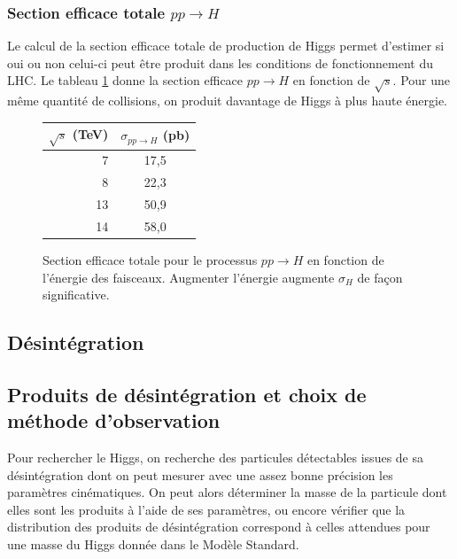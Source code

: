 \documentclass[11pt]{article} %
\begin{document}
\subsubsection{Section efficace totale $pp \to H$}

Le calcul de la section efficace totale de production de Higgs permet d'estimer si oui ou non celui-ci peut être produit dans les conditions de fonctionnement du LHC. Le tableau \ref{fig:xs_h} donne la  section efficace $pp\to H$ en fonction de $\sqrt{s}$. Pour une même quantité de collisions, on produit davantage de Higgs à plus haute énergie.

\begin{figure}[H]
      \centering
\begin{tabular}{|r|c|} 
   \hline
   $\sqrt{s}$ (TeV) & $\sigma_{pp \to H}$ (pb) \\
    \hline
   7 &  17,5\\
\hline
   8 & 22,3 \\
\hline
   13 & 50,9  \\
\hline
   14 & 58,0 \\
  \hline
\end{tabular}
\label{fig:xs_h}
\caption{Section efficace totale pour le processus $pp \to H$ en fonction de l'énergie des faisceaux. Augmenter l'énergie augmente $\sigma_H$ de façon significative.}
\end{figure}

\subsection{Désintégration}


\subsection{Produits de désintégration et choix de méthode d'observation}

Pour rechercher le Higgs, on recherche des particules détectables issues de sa désintégration dont on peut mesurer avec une assez bonne précision les paramètres cinématiques. On peut alors déterminer la masse de la particule dont elles sont les produits à l'aide de ses paramètres, ou encore vérifier que la distribution des produits de désintégration correspond à celles attendues pour une masse du Higgs donnée dans le Modèle Standard.
\end{document}
